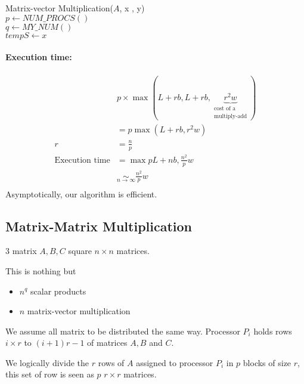 \begin{algorithm}
Matrix-vector Multiplication($A$, x , y)\\
$p\leftarrow NUM\_PROCS()$\\
$q\leftarrow MY\_NUM()$\\
$tempS\leftarrow x$\\
\end{algorithm}

\paragraph{Execution time:}
\begin{align*}
 & p\times \max (L+rb, L+rb, \underbrace{r^2w}_{\substack{\text{cost of a}\\ \text{multiply-add}}}) \\
 & = p \max (L+rb,r^2w)\\
 r & =\frac{n}{p}\\
 \text{Execution time} & = \max{pL+nb, \frac{n^2}{p}w}\\
 & \underset{n\to \infty}{\sim} \frac{n^2}{p}w\\
\end{align*}
Asymptotically, our algorithm is efficient.


\subsection{Matrix-Matrix Multiplication}
3 matrix $A, B, C$ square $n\times n$ matrices.
\begin{algorithm}
\end{algorithm}

This is nothing but
\begin{itemize}
\item $n^q$ scalar products
\item $n$ matrix-vector multiplication
\end{itemize}

We assume all matrix to be distributed the same way. Processor $P_{i}$ holds rows $i\times r$ to $(i+1)r-1$ of matrices $A,B$ and $C$.

We logically divide the $r$ rows of $A$ assigned to processor $P_i$ in $p$ blocks of size $r$, this set of row is seen as $p$ $r\times r$ matrices.

